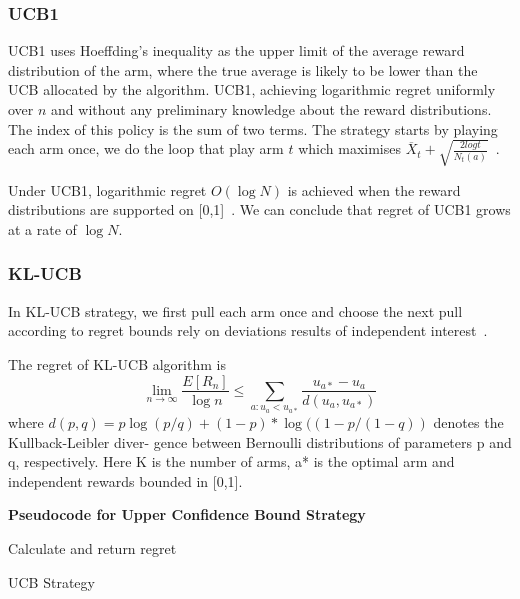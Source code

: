 \subsubsection{UCB1}
UCB1 uses Hoeffding's inequality as the upper limit of the average reward distribution of the arm, where the true average is likely to be lower than the UCB allocated by the algorithm.
UCB1, achieving logarithmic regret uniformly over $n$ and without any preliminary knowledge about the reward distributions.
The index of this policy is the sum of two terms.
The strategy starts by playing each arm once, we do the loop that play arm $t$ which maximises $\overline X_t + \sqrt{\frac{2log t}{N_t (a)}}$~\citep{Auer2002}.
\par
Under UCB1, logarithmic regret $O(\log N)$  is achieved when the reward distributions are supported on [0,1]~\citep{Chan_2020}.
We can conclude that regret of UCB1 grows at a rate of $\log N$.
\par

\subsubsection{KL-UCB}
In KL-UCB strategy, we first pull each arm once and choose the next pull according to regret bounds rely on deviations results of independent interest~\citep{Garivier2011}.
\par
The regret of KL-UCB algorithm is \[\lim_{n\to \infty} \frac{E[R_n]}{\log n} \leq  \sum_{a:u_a < u_{a*}} \frac{u_{a*}-u_a}{d(u_a,u_{a*})}  \]
where $d(p, q) = p \log(p/q) + (1 - p) * \log((1 - p/(1 - q))$ denotes the Kullback-Leibler diver- gence between Bernoulli distributions of parameters p and q, respectively.
Here K is the number of arms, a* is the optimal arm and independent rewards bounded in [0,1].\citep{Garivier2011}
\par
\textbf{Pseudocode for Upper Confidence Bound Strategy}
\newline
\begin{algorithm}[H]
        Calculate and return regret
        \caption{UCB Strategy}\label{alg:ucb_algorithm}
    \end{algorithm}

